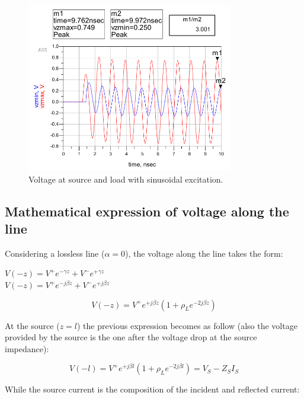 \begin{figure}[H] 
\centering
\includegraphics[width=9cm]{images/lab1_p3_vswr.png}
\caption{Voltage at source and load with sinusoidal excitation.}
\label{ads:plot:vswr} 
\end{figure}

\subsection{Mathematical expression of voltage along the line}

Considering a lossless line ($\alpha = 0$), the voltage along the line takes the form:

\begin{center}
    $V(-z) = V^+ e^{-\gamma z} +V^- e^{+ \gamma z}$ \\ \vspace{1pt}
    $V(-z) = V^+ e^{-j\beta z} +V^- e^{+ j\beta z}$ \\ \vspace{1pt}
\end{center}
\begin{equation} \label{p3:expvolt1} 
     V(-z) = V^+ e^{+ j\beta z} (1 + \rho_L e^{-2j \beta z})
\end{equation}

At the source ($z=l$) the previous expression becomes as follow (also the voltage provided by the source is the one after the voltage drop at the source impedance):

\begin{equation} \label{p3:expvolt2}
    V(-l) = V^+ e^{+ j\beta l} (1 + \rho_L e^{-2j \beta l})  = V_S - Z_S I_S
\end{equation}

While the source current is the composition of the incident and reflected current:

